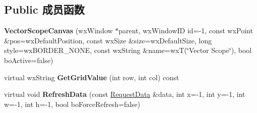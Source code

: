 \subsection*{Public 成员函数}
\begin{DoxyCompactItemize}
\item 
\hypertarget{class_vector_scope_canvas_a416bba65490086d028a6882bee05fb4d}{{\bfseries Vector\+Scope\+Canvas} (wx\+Window $\ast$parent, wx\+Window\+I\+D id=-\/1, const wx\+Point \&pos=wx\+Default\+Position, const wx\+Size \&size=wx\+Default\+Size, long style=wx\+B\+O\+R\+D\+E\+R\+\_\+\+N\+O\+N\+E, const wx\+String \&name=wx\+T(\char`\"{}Vector Scope\char`\"{}), bool bo\+Active=false)}\label{class_vector_scope_canvas_a416bba65490086d028a6882bee05fb4d}

\item 
\hypertarget{class_vector_scope_canvas_ad4138edd7afe29df0a4482efc484bbd3}{virtual wx\+String {\bfseries Get\+Grid\+Value} (int row, int col) const }\label{class_vector_scope_canvas_ad4138edd7afe29df0a4482efc484bbd3}

\item 
\hypertarget{class_vector_scope_canvas_a8b9ace8914164178cc3fc30108836f90}{virtual void {\bfseries Refresh\+Data} (const \hyperlink{struct_request_data}{Request\+Data} \&data, int x=-\/1, int y=-\/1, int w=-\/1, int h=-\/1, bool bo\+Force\+Refresh=false)}\label{class_vector_scope_canvas_a8b9ace8914164178cc3fc30108836f90}

\end{DoxyCompactItemize}
